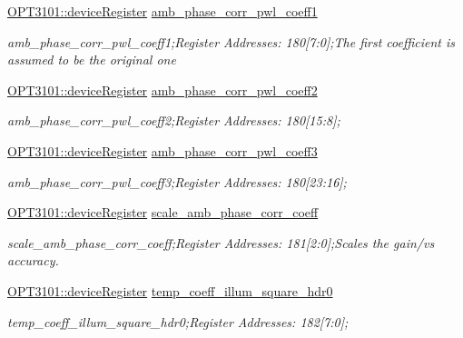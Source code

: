 \begin{DoxyCompactItemize}
\mbox{\hyperlink{class_o_p_t3101_1_1device_register}{O\+P\+T3101\+::device\+Register}} \mbox{\hyperlink{class_o_p_t3101_1_1registers_aa5317aa50442b1842ac91e54626e0455}{amb\+\_\+phase\+\_\+corr\+\_\+pwl\+\_\+coeff1}}
\begin{DoxyCompactList}\small\item\em amb\+\_\+phase\+\_\+corr\+\_\+pwl\+\_\+coeff1;Register Addresses\+: 180\mbox{[}7\+:0\mbox{]};The first coefficient is assumed to be the original one \end{DoxyCompactList}\item 
\mbox{\hyperlink{class_o_p_t3101_1_1device_register}{O\+P\+T3101\+::device\+Register}} \mbox{\hyperlink{class_o_p_t3101_1_1registers_a78d8ae98dcec8298b440c6a9fa80d863}{amb\+\_\+phase\+\_\+corr\+\_\+pwl\+\_\+coeff2}}
\begin{DoxyCompactList}\small\item\em amb\+\_\+phase\+\_\+corr\+\_\+pwl\+\_\+coeff2;Register Addresses\+: 180\mbox{[}15\+:8\mbox{]}; \end{DoxyCompactList}\item 
\mbox{\hyperlink{class_o_p_t3101_1_1device_register}{O\+P\+T3101\+::device\+Register}} \mbox{\hyperlink{class_o_p_t3101_1_1registers_af68b44c4a39c4da06bb75304d85e9ab2}{amb\+\_\+phase\+\_\+corr\+\_\+pwl\+\_\+coeff3}}
\begin{DoxyCompactList}\small\item\em amb\+\_\+phase\+\_\+corr\+\_\+pwl\+\_\+coeff3;Register Addresses\+: 180\mbox{[}23\+:16\mbox{]}; \end{DoxyCompactList}\item 
\mbox{\hyperlink{class_o_p_t3101_1_1device_register}{O\+P\+T3101\+::device\+Register}} \mbox{\hyperlink{class_o_p_t3101_1_1registers_aa72ff09dcba134f78340ba3cd9b1fa07}{scale\+\_\+amb\+\_\+phase\+\_\+corr\+\_\+coeff}}
\begin{DoxyCompactList}\small\item\em scale\+\_\+amb\+\_\+phase\+\_\+corr\+\_\+coeff;Register Addresses\+: 181\mbox{[}2\+:0\mbox{]};Scales the gain/vs accuracy. \end{DoxyCompactList}\item 
\mbox{\hyperlink{class_o_p_t3101_1_1device_register}{O\+P\+T3101\+::device\+Register}} \mbox{\hyperlink{class_o_p_t3101_1_1registers_aab5bd42698b3df11e7587bfca290183c}{temp\+\_\+coeff\+\_\+illum\+\_\+square\+\_\+hdr0}}
\begin{DoxyCompactList}\small\item\em temp\+\_\+coeff\+\_\+illum\+\_\+square\+\_\+hdr0;Register Addresses\+: 182\mbox{[}7\+:0\mbox{]}; \end{DoxyCompactList}\item 

\end{DoxyCompactItemize}
